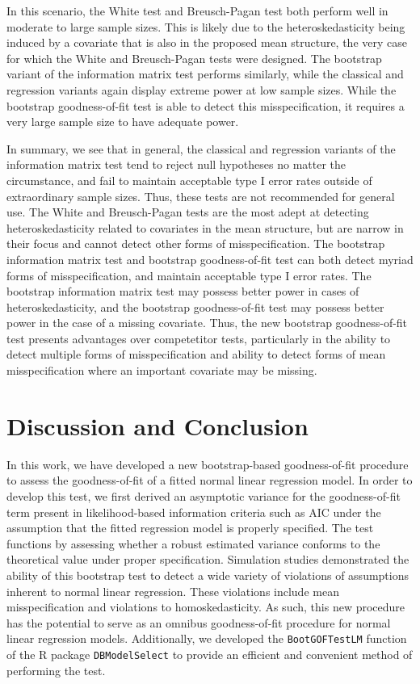 \documentclass[submit]{smj}
\begin{document}
In this scenario, the White test and Breusch-Pagan test both perform well in moderate to large sample sizes. This is likely due to the heteroskedasticity being induced by a covariate that is also in the 
proposed mean structure, the very case for which the White and Breusch-Pagan tests were designed. The bootstrap variant of the information matrix test performs similarly, while the classical and regression
variants again display extreme power at low sample sizes. While the bootstrap goodness-of-fit test is able to detect this misspecification, it requires a very large sample size to have adequate power.

In summary, we see that in general, the classical and regression variants of the information matrix test tend to reject null hypotheses no matter the circumstance, and fail to maintain acceptable type I error rates outside of extraordinary sample sizes. Thus, these tests are not recommended for general use. The White and Breusch-Pagan tests are the most adept at detecting heteroskedasticity related to covariates in the mean structure, but are narrow in their focus and cannot detect other forms of misspecification. The bootstrap information matrix test and bootstrap goodness-of-fit test can both detect myriad forms of misspecification, and maintain acceptable type I error rates. The bootstrap information matrix test may possess better power in cases of heteroskedasticity, and the bootstrap goodness-of-fit test may possess better power in the case of a missing covariate. Thus, the new bootstrap goodness-of-fit test presents advantages over competetitor tests, particularly in the ability to detect multiple forms of misspecification and ability to detect forms of mean misspecification where an important covariate may be missing.

\section{Discussion and Conclusion}

In this work, we have developed a new bootstrap-based goodness-of-fit procedure to assess the goodness-of-fit of a fitted normal linear regression model. In order
to develop this test, we first derived an asymptotic variance for the goodness-of-fit term present in likelihood-based information criteria such as AIC under the assumption
that the fitted regression model is properly specified. The test functions by assessing whether a robust estimated variance conforms to the
theoretical value under proper specification. Simulation studies demonstrated the ability of this bootstrap test to detect a wide variety of violations of assumptions inherent to
normal linear regression. These violations include mean misspecification and violations to homoskedasticity. As such, this new procedure has the potential to serve as an omnibus
goodness-of-fit procedure for normal linear regression models. Additionally, we developed the \texttt{BootGOFTestLM} function of the R package \texttt{DBModelSelect} to provide
an efficient and convenient method of performing the test.
\end{document}
